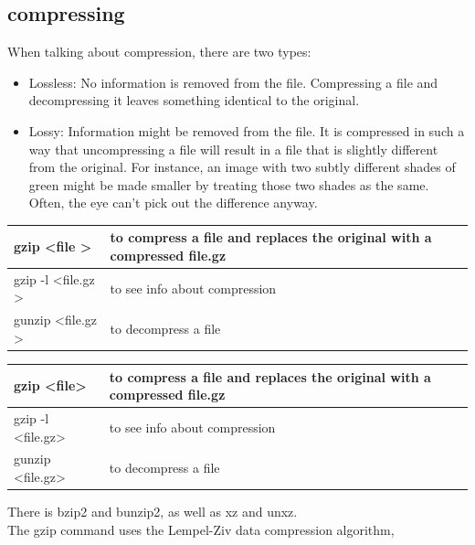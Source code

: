 \documentclass[10pt]{article}
\begin{document}
\subsection{compressing}
When talking about compression, there are two types:\\
\begin{itemize}
	\item Lossless: No information is removed from the file. Compressing a file		and decompressing it leaves something identical
		to the original.
	\item Lossy: Information might be removed from the file. It is compressed in such a way that uncompressing a file will result
		in a file that is slightly different from the original. For instance, an image with two subtly different shades of green might
		be made smaller by treating those two shades as the same. Often, the eye can’t pick out the difference anyway.
\end{itemize}
\begin{center}
	\begin{tabular}{|l|l|}


		\hline gzip \textless file \textgreater		 & to compress a file and replaces the original with a compressed file.gz\\
		\hline gzip -l \textless file.gz \textgreater	 & to see info about compression \\
		\hline gunzip \textless file.gz \textgreater  & to decompress a file\\
		\hline
	\end{tabular}
\end{center}
\begin{center}
	\begin{tabular}{|l|l|}


		\hline gzip		\textless file\textgreater		  & to compress a file and replaces the original with a compressed file.gz \\
		\hline gzip -l		\textless file.gz\textgreater  & to see info about compression \\
		\hline gunzip  \textless file.gz\textgreater   & to decompress a file\\
		\hline
	\end{tabular}
\end{center}

There is bzip2 and bunzip2, as well as xz and unxz.\\
The gzip command uses the Lempel-Ziv data compression algorithm,
\end{document}
